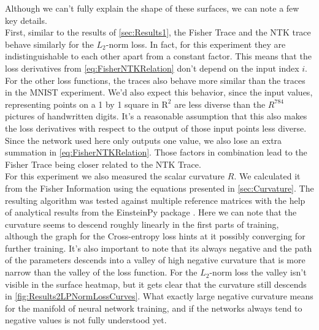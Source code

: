 Although we can't fully explain the shape of these surfaces, we can note a few key details.\\
First, similar to the results of \cref{sec:Results1}, the Fisher Trace and the NTK trace behave similarly for the $L_2$-norm loss. In fact, for this experiment they are indistinguishable to each other apart from a constant factor. This means that the loss derivatives from \cref{eq:FisherNTKRelation} don't depend on the input index $i$. For the other loss functions, the traces also behave more similar than the traces in the MNIST experiment. We'd also expect this behavior, since the input values, representing points on a 1 by 1 square in $\mathrm{R}^2$ are less diverse than the $R^{784}$ pictures of handwritten digits. It's a reasonable assumption that this also makes the loss derivatives with respect to the output of those input points less diverse. Since the network used here only outputs one value, we also lose an extra summation in \cref{eq:FisherNTKRelation}. Those factors in combination lead to the Fisher Trace being closer related to the NTK Trace.\\
For this experiment we also measured the scalar curvature $R$. We calculated it from the Fisher Information using the equations presented in \cref{sec:Curvature}. The resulting algorithm was tested against multiple reference matrices with the help of analytical results from the EinsteinPy package \cite{EinsteinPyPackage}. Here we can note that the curvature seems to descend roughly linearly in the first parts of training, although the graph for the Cross-entropy loss hints at it possibly converging for further training. It's also important to note that its always negative and the path of the parameters descends into a valley of high negative curvature that is more narrow than the valley of the loss function. For the $L_2$-norm loss the valley isn't visible in the surface heatmap, but it gets clear that the curvature still descends in \cref{fig:Results2LPNormLossCurves}. What exactly large negative curvature means for the manifold of neural network training, and if the networks always tend to negative values is not fully understood yet.
